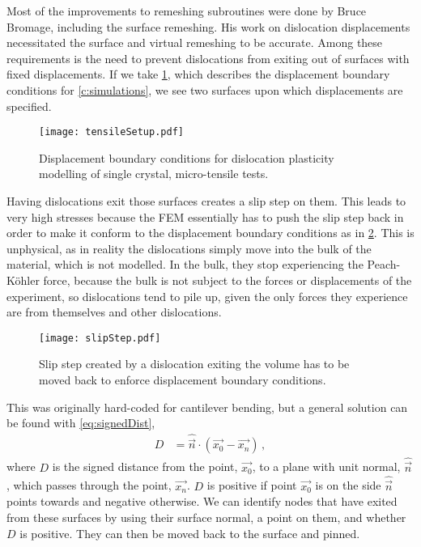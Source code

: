 Most of the improvements to remeshing subroutines were done by Bruce Bromage, including the surface remeshing. His work on dislocation displacements necessitated the surface and virtual remeshing to be accurate. Among these requirements is the need to prevent dislocations from exiting out of surfaces with fixed displacements. If we take \cref{f:tensileSetupTop}, which describes the displacement boundary conditions for \cref{c:simulations}, we see two surfaces upon which displacements are specified.
\begin{figure}
    \centering
    \texttt{[image: tensileSetup.pdf]}
    \caption[Displacement boundary conditions for dislocation plasticity modelling of single crystal, micro-tensile tests.]{Displacement boundary conditions for dislocation plasticity modelling of single crystal, micro-tensile tests.}
    \label{f:tensileSetupTop}
\end{figure}
Having dislocations exit those surfaces creates a slip step on them. This leads to very high stresses because the FEM essentially has to push the slip step back in order to make it conform to the displacement boundary conditions as in \cref{f:slipStep}. This is unphysical, as in reality the dislocations simply move into the bulk of the material, which is not modelled. In the bulk, they stop experiencing the Peach-K\"{o}hler force, because the bulk is not subject to the forces or displacements of the experiment, so dislocations tend to pile up, given the only forces they experience are from themselves and other dislocations.
\begin{figure}
    \centering
    \texttt{[image: slipStep.pdf]}
    \caption{Slip step created by a dislocation exiting the volume has to be moved back to enforce displacement boundary conditions.}
    \label{f:slipStep}
\end{figure}

This was originally hard-coded for cantilever bending, but a general solution can be found with \cref{eq:signedDist},
\begin{align}\label{eq:signedDist}
    D & = \hat{\vec{n}} \cdot (\vec{x_0} - \vec{x_n})\,,
\end{align}
where $D$ is the signed distance from the point, $\vec{x_0}$, to a plane with unit normal, $\hat{\vec{n}}$, which passes through the point, $\vec{x_n}$. $D$ is positive if point $\vec{x_0}$ is on the side $\hat{\vec{n}}$ points towards and negative otherwise. We can identify nodes that have exited from these surfaces by using their surface normal, a point on them, and whether $D$ is positive. They can then be moved back to the surface and pinned.


